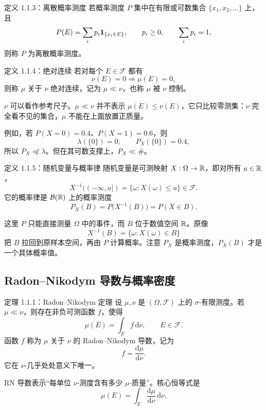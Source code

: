 \begin{definitionbox}{定义 1.1.3：离散概率测度}
若概率测度 $P$ 集中在有限或可数集合 $\{x_1,x_2,\ldots\}$ 上，且
\[
 P(E)=\sum_i p_i\mathbf 1_{\{x_i\in E\}},
 \qquad p_i\geq0,
 \qquad \sum_i p_i=1,
\]
则称 $P$ 为离散概率测度。
\end{definitionbox}

\begin{definitionbox}{定义 1.1.4：绝对连续}
若对每个 $E\in\mathcal F$ 都有
\[
 \nu(E)=0\Rightarrow\mu(E)=0,
\]
则称 $\mu$ 关于 $\nu$ 绝对连续，记为 $\mu\ll\nu$，也称 $\mu$ 被 $\nu$ 控制。
\end{definitionbox}

\begin{notebox}[绝对连续的直觉]
$\nu$ 可以看作参考尺子。$\mu\ll\nu$ 并不表示 $\mu(E)\leq\nu(E)$，它只比较零测集：$\nu$ 完全看不见的集合，$\mu$ 不能在上面放置正质量。

例如，若 $P(X=0)=0.4$、$P(X=1)=0.6$，则
\[
 \lambda(\{0\})=0,\qquad P_X(\{0\})=0.4,
\]
所以 $P_X\not\ll\lambda$。但在其可数支撑上，$P_X\ll\#$。
\end{notebox}

\begin{definitionbox}{定义 1.1.5：随机变量与概率律}
随机变量是可测映射 $X:\Omega\to\mathbb R$，即对所有 $a\in\mathbb R$，
\[
 X^{-1}(( -\infty,a])=\{\omega:X(\omega)\leq a\}\in\mathcal F.
\]
它的概率律是 $\mathcal B(\mathbb R)$ 上的概率测度
\[
 \boxed{P_X(B)=P\bigl(X^{-1}(B)\bigr)=P(X\in B)}.
\]
\end{definitionbox}

这里 $P$ 只能直接测量 $\Omega$ 中的事件，而 $B$ 位于数值空间 $\mathbb R$。原像
\[
 X^{-1}(B)=\{\omega:X(\omega)\in B\}
\]
把 $B$ 拉回到原样本空间，再由 $P$ 计算概率。注意 $P_X$ 是概率测度，$P_X(B)$ 才是一个具体概率值。

\subsection{Radon--Nikodym 导数与概率密度}

\begin{definitionbox}{定理 1.1.1：Radon--Nikodym 定理}
设 $\mu,\nu$ 是 $(\Omega,\mathcal F)$ 上的 $\sigma$-有限测度。若 $\mu\ll\nu$，则存在非负可测函数 $f$，使得
\[
 \mu(E)=\int_E f\,\mathrm d\nu,
 \qquad E\in\mathcal F.
\]
函数 $f$ 称为 $\mu$ 关于 $\nu$ 的 Radon--Nikodym 导数，记为
\[
 f=\frac{\mathrm d\mu}{\mathrm d\nu}.
\]
它在 $\nu$-几乎处处意义下唯一。
\end{definitionbox}

RN 导数表示“每单位 $\nu$-测度含有多少 $\mu$-质量”。核心恒等式是
\[
 \boxed{
 \mu(E)=\int_E\frac{\mathrm d\mu}{\mathrm d\nu}\,\mathrm d\nu.}
\]


